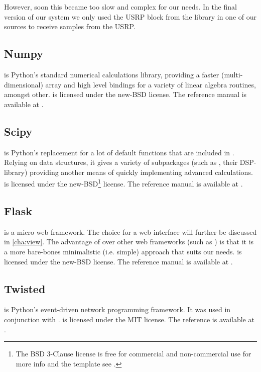 \documentclass[a4paper, openany, oneside]{memoir}
\begin{document}
However, soon this became too slow and complex for our needs. In the final version of our system we only used the USRP block from the  library in one of our sources to receive samples from the USRP.


\subsection{Numpy}
\label{sec:numpy}
 is Python's standard numerical calculations library, providing a faster (multi-dimensional) array and high level bindings for a variety of linear algebra routines, amongst other.  is licensed under the new-BSD license. The reference manual is available at \cite{numpyscipy}.

\subsection{Scipy}
\label{sec:scipy}
 is Python's replacement for a lot of default functions that are included in \matlab{}. Relying on  data structures, it gives a variety of subpackages (such as , their DSP-library) providing another means of quickly implementing advanced calculations.  is licensed under the new-BSD\footnote{\label{fn:bsd}The BSD 3-Clause license is free for commercial and non-commercial use for more info and the template see \cite{bsdlic}.} license. The reference manual is available at \cite{numpyscipy}.

\subsection{Flask}
\label{sec:flask}
 is a micro web framework. The choice for a web interface will further be discussed in \cref{cha:view}. The advantage of  over other web frameworks (such as ) is that it is a more bare-bones minimalistic (i.e. simple) approach that suits our needs.  is licensed under the new-BSD license. The reference manual is available at \cite{flask}.

\subsection{Twisted}
\label{sub:twisted}
 is Python's event-driven network programming framework. It was used in conjunction with .  is licensed under the MIT license. The reference is available at \cite{twisted}.
\end{document}
